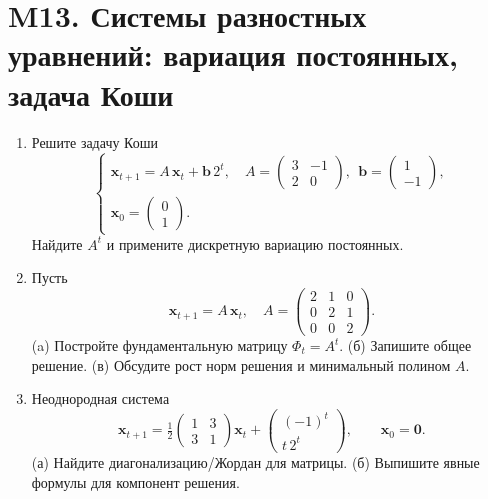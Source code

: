 \documentclass[12pt]{article}
\begin{document}
\section*{M13. Системы разностных уравнений: вариация постоянных, задача Коши}
\begin{enumerate}
\item Решите задачу Коши
\[
\begin{cases}
\mathbf x_{t+1}=A\,\mathbf x_t+\mathbf b\,2^t,\quad
A=\begin{pmatrix}3&-1\\2&0\end{pmatrix},\ \ \mathbf b=\begin{pmatrix}1\\-1\end{pmatrix},\\[2mm]
\mathbf x_0=\begin{pmatrix}0\\1\end{pmatrix}.
\end{cases}
\]
Найдите $A^t$ и примените дискретную вариацию постоянных.

\item Пусть
\[
\mathbf x_{t+1}=A\,\mathbf x_t,\quad
A=\begin{pmatrix}2&1&0\\0&2&1\\0&0&2\end{pmatrix}.
\]
(a) Постройте фундаментальную матрицу $\Phi_t=A^t$. (б) Запишите общее решение. (в) Обсудите рост норм решения и минимальный полином $A$.

\item Неоднородная система
\[
\mathbf x_{t+1}=\tfrac12
\begin{pmatrix}
1&3\\
3&1
\end{pmatrix}\mathbf x_t+\begin{pmatrix}(-1)^t\\ t\,2^t\end{pmatrix},\qquad \mathbf x_0=\mathbf 0.
\]
(а) Найдите диагонализацию/Жордан для матрицы. (б) Выпишите явные формулы для компонент решения.
\end{enumerate}
\end{document}
